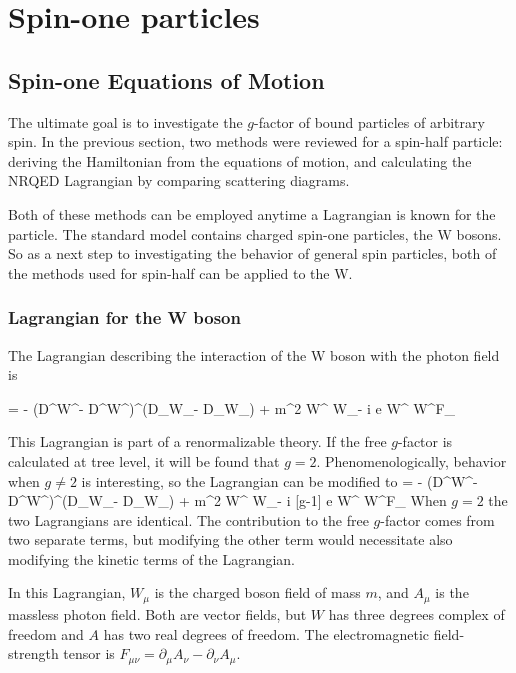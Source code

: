 \chapter{Spin-one particles}

\section{Spin-one Equations of Motion}

The ultimate goal is to investigate the $g$-factor of bound particles of arbitrary spin.  In the previous section, two methods were reviewed for a spin-half particle: deriving the Hamiltonian from the equations of motion, and calculating the NRQED Lagrangian by comparing scattering diagrams.  

Both of these methods can be employed anytime a Lagrangian is known for the particle.  The standard model contains charged spin-one particles, the W bosons.  So as a next step to investigating the behavior of general spin particles, both of the methods used for spin-half can be applied to the W.

\subsection{Lagrangian for the W boson}
The Lagrangian describing the interaction of the W boson with the photon field is

\beq
{} 
	=	- (D^\mu W^\nu - D^\nu W^\mu)^\dagger (D_\mu W_\nu - D_\nu W_\mu)
		+ m^2 W^{\mu \dagger} W_\mu - i e  W^{\mu \dagger} W^\nu F_{\mu\nu}
\eeq

This Lagrangian is part of a renormalizable theory.  If the free $g$-factor is calculated at tree level, it will be found that $g=2$.  Phenomenologically, behavior when $g \neq 2$ is interesting, so the Lagrangian can be modified to
\beq \label{eq:S1:LagrangianAnom}
	=	- (D^\mu W^\nu - D^\nu W^\mu)^\dagger (D_\mu W_\nu - D_\nu W_\mu)
		+ m^2 W^{\mu \dagger} W_\mu - i [g-1] e  W^{\mu \dagger} W^\nu F_{\mu\nu}
\eeq
When $g=2$ the two Lagrangians are identical.  The contribution to the free $g$-factor comes from two separate terms, but modifying the other term would necessitate also modifying the kinetic terms of the Lagrangian.  %

In this Lagrangian, $W_\mu$ is the charged boson field of mass $m$, and $A_\mu$ is the massless photon field.  Both are vector fields, but $W$ has three degrees complex of freedom and $A$ has two real degrees of freedom.    The electromagnetic field-strength tensor is $F_{\mu\nu} = \partial_\mu A_\nu - \partial_\nu A_\mu$.  

